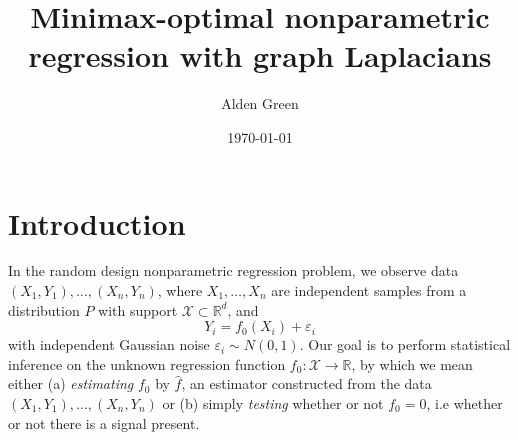 \documentclass{article}
\newcommand{\Reals}{\mathbb{R}}
\newcommand{\1}{\mathbf{1}}
\newcommand{\Rd}{\Reals^d}
\newcommand{\Xset}{\mathcal{X}}
\newcommand{\wh}[1]{\widehat{#1}}
\theoremstyle{alden}
\theoremstyle{aldenthm}
\theoremstyle{definition}
\theoremstyle{remark}
\begin{document}
\title{Minimax-optimal nonparametric regression with graph Laplacians}
\author{Alden Green}
\date{\today}
\maketitle

\section{Introduction}
\label{sec:introduction}

In the random design nonparametric regression problem, we observe data $(X_1,Y_1),\ldots,(X_n,Y_n)$, where $X_1,\ldots,X_n$ are independent samples from a distribution $P$ with support $\Xset \subset \Rd$, and 
\begin{equation}
\label{eqn:random_design_regression}
Y_i = f_0(X_i) + \varepsilon_i
\end{equation}
with independent Gaussian noise $\varepsilon_i \sim N(0,1)$. Our goal is to perform statistical inference on the unknown regression function $f_0: \Xset \to \Reals$, by which we mean either (a) \emph{estimating} $f_0$ by $\wh{f}$, an estimator constructed from the data $(X_1,Y_1),\ldots,(X_n,Y_n)$ or (b) simply \emph{testing} whether or not $f_0 = 0$, i.e whether or not there is a signal present. 
\end{document}
